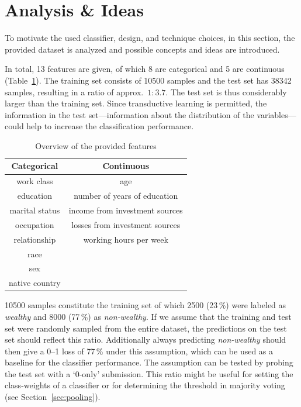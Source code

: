 \documentclass[a4paper,11pt]{article}
\begin{document}
\section{Analysis \& Ideas}
\label{sec:analysis}

To motivate the used classifier, design, and technique choices, in
this section, the provided dataset is analyzed and possible concepts
and ideas are introduced.

In total, 13 features are given, of which 8 are categorical and 5 are
continuous (Table~\ref{tab:features}).
The training set consists of 10500 samples and the test set has 38342
samples, resulting in a ratio of approx.\ $1:3.7$.  The test set is
thus considerably larger than the training set.
Since transductive learning is permitted, the information in the test
set---information about the distribution of the variables---could help
to increase the classification performance.

\begin{table}[h]
  \centering
  \begin{tabular}{cc}
    \toprule
  Categorical  & Continuous                     \\
    \midrule
    work class & age                            \\
    education  & number of years of education   \\
marital status & income from investment sources \\
occupation     & losses from investment sources \\
relationship   & working hours per week         \\
race           &                                \\
sex            &                                \\
native country &                                \\
      \bottomrule
  \end{tabular}
  \caption{{Overview of the provided features}}
  \label{tab:features}
\end{table}

10500 samples constitute the training set of which 2500 (23\,\%) were
labeled as \emph{wealthy} and 8000 (77\,\%) as \emph{non-wealthy}. If
we assume that the training and test set were randomly sampled from
the entire dataset, the predictions on the test set should reflect
this ratio. Additionally always predicting \emph{non-wealthy} should
then give a 0--1 loss of 77\,\% under this assumption, which can be
used as a baseline for the classifier performance. The assumption can
be tested by probing the test set with a `0-only' submission. This
ratio might be useful for setting the class-weights of a classifier or
for determining the threshold in majority voting
(see
Section~\ref{sec:pooling}).
\end{document}
